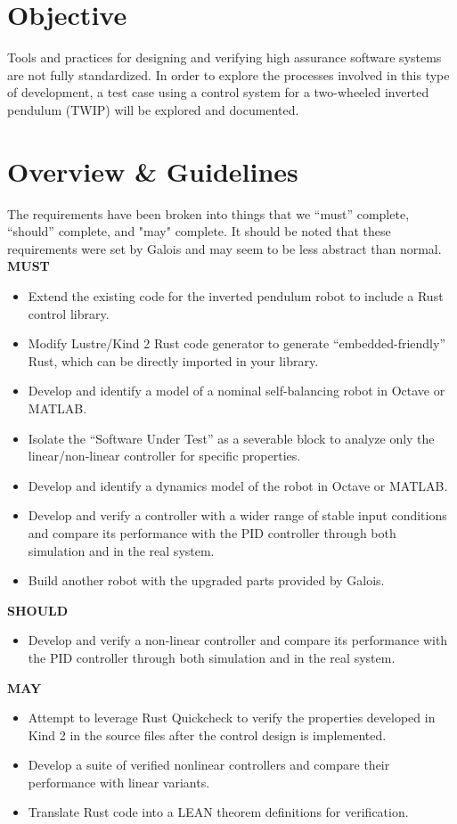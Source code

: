 \documentclass[a4paper,12pt]{article}
\begin{document}
\section{Objective}
	Tools and practices for designing and verifying high assurance software systems are not fully standardized. In order to explore the processes involved in this type of development, a test case using a control system for a two-wheeled inverted pendulum (TWIP) will be explored and documented.
\section{Overview \& Guidelines}
The requirements have been broken into things that we “must” complete, “should” complete, and "may" complete. It should be noted that these requirements were set by Galois and may seem to be less abstract than normal.\\

\textbf{MUST}
\begin{itemize}
    \item Extend the existing code for the inverted pendulum robot to include a Rust control library.
    \item Modify Lustre/Kind 2 Rust code generator to generate “embedded-friendly” Rust, which can be directly imported in your library.
    \item Develop and identify a model of a nominal self-balancing robot in Octave or MATLAB.
    \item Isolate the “Software Under Test” as a severable block to analyze only the linear/non-linear controller for specific properties.
    \item Develop and identify a dynamics model of the robot in Octave or MATLAB.
    \item Develop and verify a controller with a wider range of stable input conditions and compare its performance with the PID controller through both simulation and in the real system.
    \item Build another robot with the upgraded parts provided by Galois.
\end{itemize}
\textbf{SHOULD}
\begin{itemize}
    \item Develop and verify a non-linear controller and compare its performance with the PID controller through both simulation and in the real system.
\end{itemize}
\textbf{MAY}
\begin{itemize}
    \item Attempt to leverage Rust Quickcheck to verify the properties developed in Kind 2 in the source files after the control design is implemented.
    \item Develop a suite of verified nonlinear controllers and compare their performance with linear variants.
    \item Translate Rust code into a LEAN theorem definitions for verification.
\end{itemize}
\end{document}
